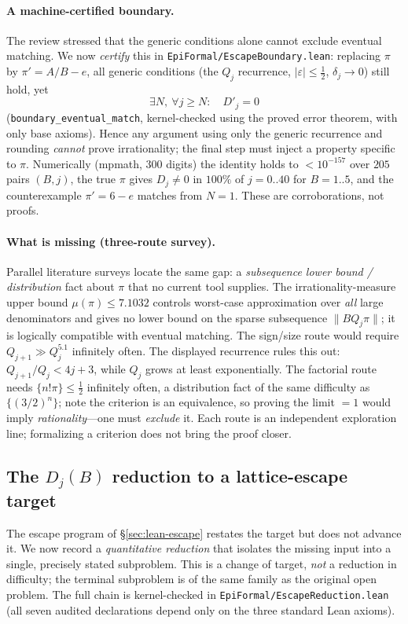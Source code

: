 \documentclass[11pt]{amsart}
\theoremstyle{definition}
\theoremstyle{remark}
\numberwithin{equation}{section}
\begin{document}
\paragraph{A machine-certified boundary.} The review stressed that the generic conditions alone cannot exclude eventual matching. We now \emph{certify} this in \texttt{EpiFormal/EscapeBoundary.lean}: replacing $\pi$ by $\pi'=A/B-e$, all generic conditions (the $Q_j$ recurrence, $|\varepsilon|\le\tfrac12$, $\delta_j\to0$) still hold, yet
\[
\exists N,\ \forall j\ge N:\quad D'_j=0
\]
(\texttt{boundary\_eventual\_match}, kernel-checked using the proved error theorem, with only base axioms). Hence any argument using only the generic recurrence and rounding \emph{cannot} prove irrationality; the final step must inject a property specific to $\pi$. Numerically (mpmath, 300 digits) the identity holds to $<10^{-157}$ over $205$ pairs $(B,j)$, the true $\pi$ gives $D_j\neq0$ in $100\%$ of $j=0..40$ for $B=1..5$, and the counterexample $\pi'=6-e$ matches from $N=1$. These are corroborations, not proofs.

\paragraph{What is missing (three-route survey).} Parallel literature surveys locate the same gap: a \emph{subsequence lower bound / distribution} fact about $\pi$ that no current tool supplies. The irrationality-measure upper bound $\mu(\pi)\le7.1032$ controls worst-case approximation over \emph{all} large denominators and gives no lower bound on the sparse subsequence $\|BQ_j\pi\|$; it is logically compatible with eventual matching. The sign/size route would require $Q_{j+1}\gg Q_j^{5.1}$  infinitely often. The displayed recurrence rules this out: $Q_{j+1}/Q_j<4j+3$, while $Q_j$ grows at least exponentially. The factorial route needs $\{n!\pi\}\le\tfrac12$ infinitely often, a distribution fact of the same difficulty as $\{(3/2)^n\}$; note the criterion is an equivalence, so proving the limit $=1$ would imply \emph{rationality}---one must \emph{exclude} it. Each route is an independent exploration line; formalizing a criterion does not bring the proof closer.

\subsection{The \texorpdfstring{$D_j(B)$}{Dj(B)} reduction to a lattice-escape target}\label{sec:lean-reduction}

The escape program of \S\ref{sec:lean-escape} restates the target but does not advance it. We now record a \emph{quantitative reduction} that isolates the missing input into a single, precisely stated subproblem. This is a change of target, \emph{not} a reduction in difficulty; the terminal subproblem is of the same family as the original open problem. The full chain is kernel-checked in \texttt{EpiFormal/EscapeReduction.lean} (all seven audited declarations depend only on the three standard Lean axioms).
\end{document}
